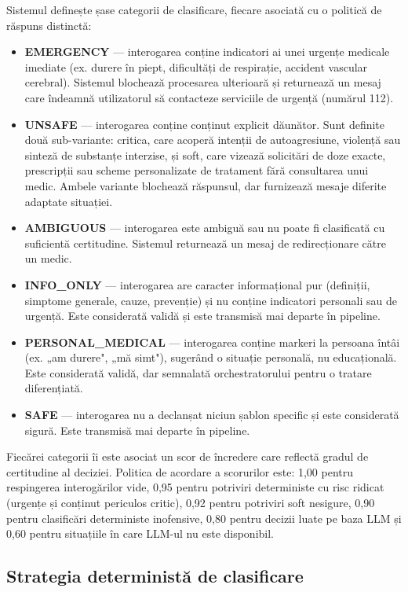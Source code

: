 \documentclass[12pt, a4paper, oneside, romanian]{teza-upb}
\begin{document}
Sistemul definește șase categorii de clasificare, fiecare asociată cu o politică de răspuns distinctă:

\begin{itemize}
    \item \textbf{EMERGENCY} — interogarea conține indicatori ai unei urgențe medicale imediate (ex. durere în piept, dificultăți de respirație, accident vascular cerebral). Sistemul blochează procesarea ulterioară și returnează un mesaj care îndeamnă utilizatorul să contacteze serviciile de urgență (numărul 112).
    \item \textbf{UNSAFE} — interogarea conține conținut explicit dăunător. Sunt definite două sub-variante: critica, care acoperă intenții de autoagresiune, violență sau sinteză de substanțe interzise, și soft, care vizează solicitări de doze exacte, prescripții sau scheme personalizate de tratament fără consultarea unui medic. Ambele variante blochează răspunsul, dar furnizează mesaje diferite adaptate situației.
    \item \textbf{AMBIGUOUS} — interogarea este ambiguă sau nu poate fi clasificată cu suficientă certitudine. Sistemul returnează un mesaj de redirecționare către un medic.
    \item \textbf{INFO\_ONLY} — interogarea are caracter informațional pur (definiții, simptome generale, cauze, prevenție) și nu conține indicatori personali sau de urgență. Este considerată validă și este transmisă mai departe în pipeline.
    \item \textbf{PERSONAL\_MEDICAL} — interogarea conține markeri la persoana întâi (ex. „am durere", „mă simt"), sugerând o situație personală, nu educațională. Este considerată validă, dar semnalată orchestratorului pentru o tratare diferențiată.
    \item \textbf{SAFE} — interogarea nu a declanșat niciun șablon specific și este considerată sigură. Este transmisă mai departe în pipeline.
\end{itemize}

Fiecărei categorii îi este asociat un scor de încredere care reflectă gradul de certitudine al deciziei. Politica de acordare a scorurilor este: 1,00 pentru respingerea interogărilor vide, 0,95 pentru potriviri deterministe cu risc ridicat (urgențe și conținut periculos critic), 0,92 pentru potriviri soft nesigure, 0,90 pentru clasificări deterministe inofensive, 0,80 pentru decizii luate pe baza LLM și 0,60 pentru situațiile în care LLM-ul nu este disponibil.

\subsection{Strategia deterministă de clasificare}
\end{document}
